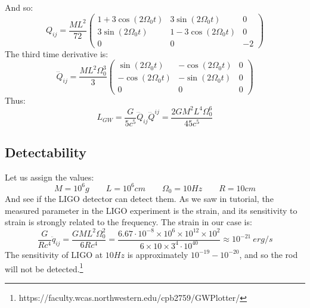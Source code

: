 \documentclass{article}
\begin{document}
And so:
\begin{equation}
    Q_{ij} = \frac{M L^2}{72}\begin{pmatrix}
        1 + 3\cos(2\Omega_0 t) & 3\sin(2\Omega_0 t) & 0 \\
        3\sin(2\Omega_0 t) & 1 - 3\cos(2\Omega_0 t) & 0 \\
        0 & 0 & -2
    \end{pmatrix}
\end{equation}
The third time derivative is:
\begin{equation}
    \dddot{Q}_{ij} = \frac{M L^2\Omega_0^3}{3}\begin{pmatrix}
        \sin(2\Omega_0 t) & - \cos(2\Omega_0 t) & 0 \\
        - \cos(2\Omega_0 t) & - \sin(2\Omega_0 t) & 0 \\
        0 & 0 & 0
    \end{pmatrix}
\end{equation}
Thus:
\begin{equation}
\label{eq:total-luminosity}
    L_{GW} = \frac{G}{5c^5} \dddot{Q}_{ij} \dddot{Q}^{ij} =
    \frac{2G M^2 L^4\Omega_0^6}{45c^5}
\end{equation}
\subsection{Detectability}
Let us assign the values:
\begin{equation}
    M = 10^6 g \qquad L = 10^6 cm \qquad \Omega_0 = 10 Hz \qquad R = 10 cm
\end{equation}
And see if the LIGO detector can detect them. As we saw in tutorial, the measured parameter in the LIGO experiment is the strain, and its sensitivity to strain is strongly related to the frequency. The strain in our case is:
\begin{equation}
    \frac{G}{Rc^4}\ddot{q}_{ij} = \frac{GM L^2\Omega_0^2}{6Rc^4} =
    \frac{6.67\cdot10^{-8}\times10^6\times10^{12}\times10^2}{6\times10\times3^4\cdot10^{40}} \approx 10^{-21} \ erg/s
\end{equation}
The sensitivity of LIGO at $10 Hz$ is approximately $10^{-19}-10^{-20}$, and so the rod will not be detected.\footnote{https://faculty.wcas.northwestern.edu/cpb2759/GWPlotter/}
\end{document}
